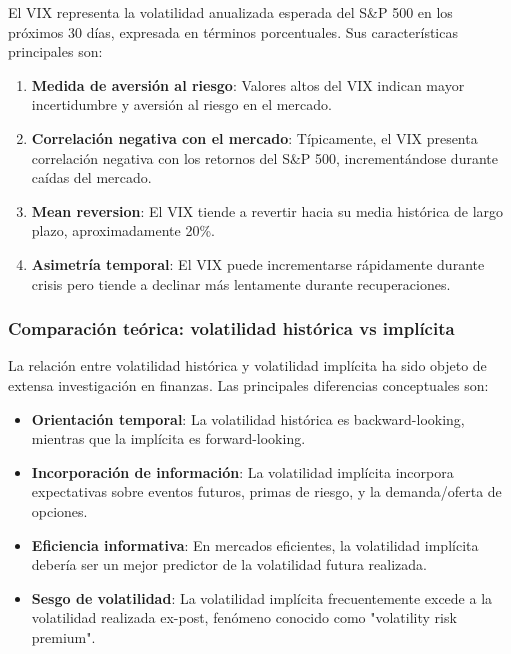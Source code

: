 El VIX representa la volatilidad anualizada esperada del S\&P 500 en los próximos 30 días, expresada en términos porcentuales. Sus características principales son:

\begin{enumerate}
    \item \textbf{Medida de aversión al riesgo}: Valores altos del VIX indican mayor incertidumbre y aversión al riesgo en el mercado.
    
    \item \textbf{Correlación negativa con el mercado}: Típicamente, el VIX presenta correlación negativa con los retornos del S\&P 500, incrementándose durante caídas del mercado.
    
    \item \textbf{Mean reversion}: El VIX tiende a revertir hacia su media histórica de largo plazo, aproximadamente 20\%.
    
    \item \textbf{Asimetría temporal}: El VIX puede incrementarse rápidamente durante crisis pero tiende a declinar más lentamente durante recuperaciones.
\end{enumerate}

\subsubsection{Comparación teórica: volatilidad histórica vs implícita}

La relación entre volatilidad histórica y volatilidad implícita ha sido objeto de extensa investigación en finanzas. Las principales diferencias conceptuales son:

\begin{itemize}
    \item \textbf{Orientación temporal}: La volatilidad histórica es backward-looking, mientras que la implícita es forward-looking.
    
    \item \textbf{Incorporación de información}: La volatilidad implícita incorpora expectativas sobre eventos futuros, primas de riesgo, y la demanda/oferta de opciones.
    
    \item \textbf{Eficiencia informativa}: En mercados eficientes, la volatilidad implícita debería ser un mejor predictor de la volatilidad futura realizada.
    
    \item \textbf{Sesgo de volatilidad}: La volatilidad implícita frecuentemente excede a la volatilidad realizada ex-post, fenómeno conocido como "volatility risk premium".
\end{itemize}

